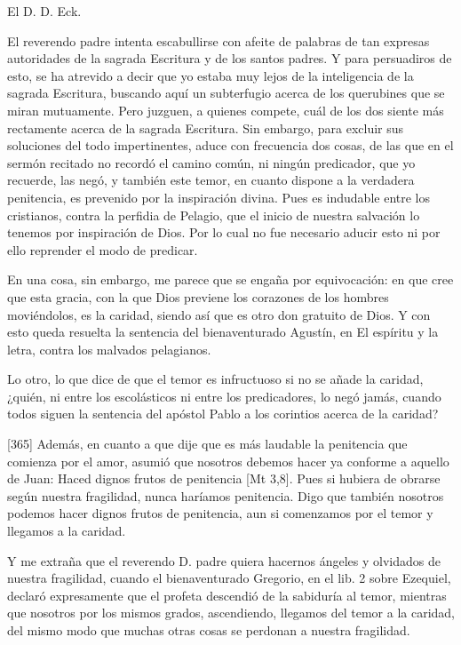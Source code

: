 El D. D. Eck.

El reverendo padre intenta escabullirse con afeite de palabras de tan expresas autoridades de la sagrada Escritura y de los santos padres. Y para persuadiros de esto, se ha atrevido a decir que yo estaba muy lejos de la inteligencia de la sagrada Escritura, buscando aquí un subterfugio acerca de los querubines que se miran mutuamente. Pero juzguen, a quienes compete, cuál de los dos siente más rectamente acerca de la sagrada Escritura. Sin embargo, para excluir sus soluciones del todo impertinentes, aduce con frecuencia dos cosas, de las que en el sermón recitado no recordó el camino común, ni ningún predicador, que yo recuerde, las negó, y también este temor, en cuanto dispone a la verdadera penitencia, es prevenido por la inspiración divina. Pues es indudable entre los cristianos, contra la perfidia de Pelagio, que el inicio de nuestra salvación lo tenemos por inspiración de Dios. Por lo cual no fue necesario aducir esto ni por ello reprender el modo de predicar.

En una cosa, sin embargo, me parece que se engaña por equivocación: en que cree que esta gracia, con la que Dios previene los corazones de los hombres moviéndolos, es la caridad, siendo así que es otro don gratuito de Dios. Y con esto queda resuelta la sentencia del bienaventurado Agustín, en El espíritu y la letra, contra los malvados pelagianos.

Lo otro, lo que dice de que el temor es infructuoso si no se añade la caridad, ¿quién, ni entre los escolásticos ni entre los predicadores, lo negó jamás, cuando todos siguen la sentencia del apóstol Pablo a los corintios acerca de la caridad?

[365] Además, en cuanto a que dije que es más laudable la penitencia que comienza por el amor, asumió que nosotros debemos hacer ya conforme a aquello de Juan: Haced dignos frutos de penitencia [Mt 3,8]. Pues si hubiera de obrarse según nuestra fragilidad, nunca haríamos penitencia. Digo que también nosotros podemos hacer dignos frutos de penitencia, aun si comenzamos por el temor y llegamos a la caridad.

Y me extraña que el reverendo D. padre quiera hacernos ángeles y olvidados de nuestra fragilidad, cuando el bienaventurado Gregorio, en el lib. 2 sobre Ezequiel, declaró expresamente que el profeta descendió de la sabiduría al temor, mientras que nosotros por los mismos grados, ascendiendo, llegamos del temor a la caridad, del mismo modo que muchas otras cosas se perdonan a nuestra fragilidad.

